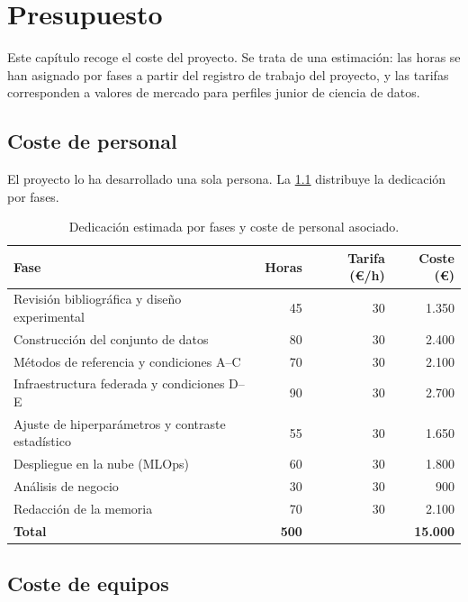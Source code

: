 \chapter{Presupuesto}
\label{cap:presupuesto}

Este capítulo recoge el coste del proyecto. Se trata de una estimación: las horas se han asignado
por fases a partir del registro de trabajo del proyecto, y las tarifas corresponden a valores de
mercado para perfiles junior de ciencia de datos.

\section{Coste de personal}

El proyecto lo ha desarrollado una sola persona. La \cref{tab:presupuesto_personal} distribuye la
dedicación por fases.

\begin{table}[H]
  \centering
  \caption[Coste de personal]{Dedicación estimada por fases y coste de personal asociado.}
  \label{tab:presupuesto_personal}
  \begin{tabular}{lrrr}
    \toprule
    Fase & Horas & Tarifa (€/h) & Coste (€) \\
    \midrule
    Revisión bibliográfica y diseño experimental   &  45 & 30 & 1.350 \\
    Construcción del conjunto de datos             &  80 & 30 & 2.400 \\
    Métodos de referencia y condiciones A--C       &  70 & 30 & 2.100 \\
    Infraestructura federada y condiciones D--E    &  90 & 30 & 2.700 \\
    Ajuste de hiperparámetros y contraste estadístico & 55 & 30 & 1.650 \\
    Despliegue en la nube (MLOps)                  &  60 & 30 & 1.800 \\
    Análisis de negocio                            &  30 & 30 &   900 \\
    Redacción de la memoria                        &  70 & 30 & 2.100 \\
    \midrule
    \textbf{Total}                                 & \textbf{500} & & \textbf{15.000} \\
    \bottomrule
  \end{tabular}
\end{table}

\section{Coste de equipos}

